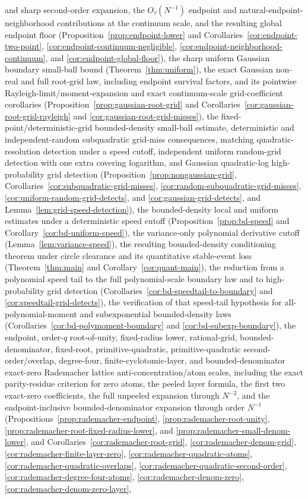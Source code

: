 \documentclass[11pt]{amsart}
\numberwithin{equation}{section}
\theoremstyle{definition}
\theoremstyle{remark}
\begin{document}
\begin{itemize}
and sharp second-order expansion, the \(O_\tau(N^{-1})\) endpoint and natural-endpoint-neighborhood contributions at the continuum scale, and the resulting global endpoint floor (Proposition~\ref{prop:endpoint-lower} and Corollaries~\ref{cor:endpoint-two-point}, \ref{cor:endpoint-continuum-negligible}, \ref{cor:endpoint-neighborhood-continuum}, and \ref{cor:endpoint-global-floor}), the sharp uniform Gaussian boundary small-ball bound (Theorem~\ref{thm:uniform}), the exact Gaussian non-real and full root-grid law, including endpoint survival factors, and its pointwise Rayleigh-limit/moment-expansion and exact continuum-scale grid-coefficient corollaries (Proposition~\ref{prop:gaussian-root-grid} and Corollaries~\ref{cor:gaussian-root-grid-rayleigh} and \ref{cor:gaussian-root-grid-misses}), the fixed-point/deterministic-grid bounded-density small-ball estimate, deterministic and independent-random subquadratic grid-miss consequences, matching quadratic-resolution detection under a speed cutoff, independent uniform random-grid detection with one extra covering logarithm, and Gaussian quadratic-log high-probability grid detection (Proposition~\ref{prop:nongaussian-grid}, Corollaries~\ref{cor:subquadratic-grid-misses}, \ref{cor:random-subquadratic-grid-misses}, \ref{cor:uniform-random-grid-detects}, and \ref{cor:gaussian-grid-detects}, and Lemma~\ref{lem:grid-speed-detection}), the bounded-density local and uniform estimates under a deterministic speed cutoff (Proposition~\ref{prop:bd-speed} and Corollary~\ref{cor:bd-uniform-speed}), the variance-only polynomial derivative cutoff (Lemma~\ref{lem:variance-speed}), the resulting bounded-density conditioning theorem under circle clearance and its quantitative stable-event loss (Theorem~\ref{thm:main} and Corollary~\ref{cor:quant-main}), the reduction from a polynomial speed tail to the full polynomial-scale boundary law and to high-probability grid detection (Corollaries~\ref{cor:bd-speedtail-to-boundary} and \ref{cor:speedtail-grid-detects}), the verification of that speed-tail hypothesis for all-polynomial-moment and subexponential bounded-density laws (Corollaries~\ref{cor:bd-polymoment-boundary} and \ref{cor:bd-subexp-boundary}), the endpoint, order-\(q\) root-of-unity, fixed-radius lower, rational-grid, bounded-denominator, fixed-root, primitive-quadratic, primitive-quadratic second-order/overlap, degree-four, finite-cyclotomic-layer, and bounded-denominator exact-zero Rademacher lattice anti-concentration/atom scales, including the exact parity-residue criterion for zero atoms, the peeled layer formula, the first two exact-zero coefficients, the full unpeeled expansion through \(N^{-2}\), and the endpoint-inclusive bounded-denominator expansion through order \(N^{-1}\) (Propositions~\ref{prop:rademacher-endpoint}, \ref{prop:rademacher-root-unity}, \ref{prop:rademacher-root-fixed-radius-lower}, and \ref{prop:rademacher-small-denom-lower}, and Corollaries~\ref{cor:rademacher-root-grid}, \ref{cor:rademacher-denom-grid}, \ref{cor:rademacher-finite-layer-zero}, \ref{cor:rademacher-quadratic-atoms}, \ref{cor:rademacher-quadratic-overlaps}, \ref{cor:rademacher-quadratic-second-order}, \ref{cor:rademacher-degree-four-atoms}, \ref{cor:rademacher-denom-zero}, \ref{cor:rademacher-denom-zero-layer}, 
\end{itemize}
\end{document}
